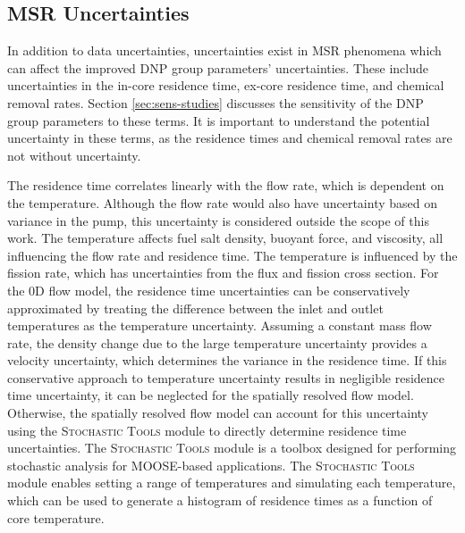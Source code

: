 \subsection{MSR Uncertainties}
In addition to data uncertainties, uncertainties exist in \gls{MSR} phenomena which can affect the improved \gls{DNP} group parameters' uncertainties.
These include uncertainties in the in-core residence time, ex-core residence time, and chemical removal rates.
Section \ref{sec:sens-studies} discusses the sensitivity of the \gls{DNP} group parameters to these terms.
It is important to understand the potential uncertainty in these terms, as the residence times and chemical removal rates are not without uncertainty.

The residence time correlates linearly with the flow rate, which is dependent on the temperature.
Although the flow rate would also have uncertainty based on variance in the pump, this uncertainty is considered outside the scope of this work.
The temperature affects fuel salt density, buoyant force, and viscosity, all influencing the flow rate and residence time.
The temperature is influenced by the fission rate, which has uncertainties from the flux and fission cross section.
For the 0D flow model, the residence time uncertainties can be conservatively approximated by treating the difference between the inlet and outlet temperatures as the temperature uncertainty.
Assuming a constant mass flow rate, the density change due to the large temperature uncertainty provides a velocity uncertainty, which determines the variance in the residence time.
If this conservative approach to temperature uncertainty results in negligible residence time uncertainty, it can be neglected for the spatially resolved flow model.
Otherwise, the spatially resolved flow model can account for this uncertainty using the \textsc{Stochastic Tools} module to directly determine residence time uncertainties.
The \textsc{Stochastic Tools} module is a toolbox designed for performing stochastic analysis for \gls{MOOSE}-based applications.
The \textsc{Stochastic Tools} module enables setting a range of temperatures and simulating each temperature, which can be used to generate a histogram of residence times as a function of core temperature.

